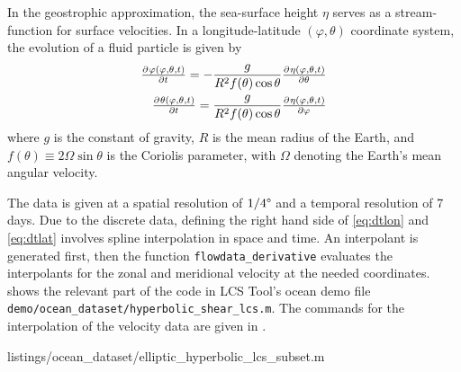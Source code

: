 \documentclass[5p]{elsarticle}
\begin{document}
\begin{sloppypar}
In the geostrophic approximation, the sea-surface height $\eta$ serves as a stream-function for surface velocities. In a longitude-latitude $(\varphi,\theta)$ coordinate system, the evolution of a fluid particle is given by
\begin{eqnarray}
\pd{\varphi(\varphi,\theta,t)}{t} = -\frac{g}{R^2 f(\theta) \cos\theta} \pd{\eta(\varphi,\theta,t)}{\theta}\label{eq:dtlon}\\
\pd{\theta(\varphi,\theta,t)}{t} = \frac{g}{R^2 f(\theta) \cos\theta}\pd{\eta(\varphi,\theta,t)}{\varphi}
\label{eq:dtlat}
\end{eqnarray}
where $g$ is the constant of gravity, $R$ is the mean radius of the Earth, and $f(\theta) \equiv 2\Omega\sin\theta$ is the Coriolis parameter, with $\Omega$ denoting the Earth's mean angular velocity.
\end{sloppypar}

\begin{sloppypar}
The data is given at a spatial resolution of $1/4\degree$ and a temporal resolution of 7 days.
Due to the discrete data, defining the right hand side of \cref{eq:dtlon} and \cref{eq:dtlat} involves spline interpolation in space and time.
An interpolant is generated first, then the function \lstinline!flowdata_derivative! evaluates the interpolants for the zonal and meridional velocity at the needed coordinates.
 shows the relevant part of the code in LCS Tool's ocean demo file \lstinline!demo/ocean_dataset/hyperbolic_shear_lcs.m!.
The commands for the interpolation of the velocity data are given in .
\end{sloppypar}


        {listings/ocean_dataset/elliptic_hyperbolic_lcs_subset.m}
\end{document}
